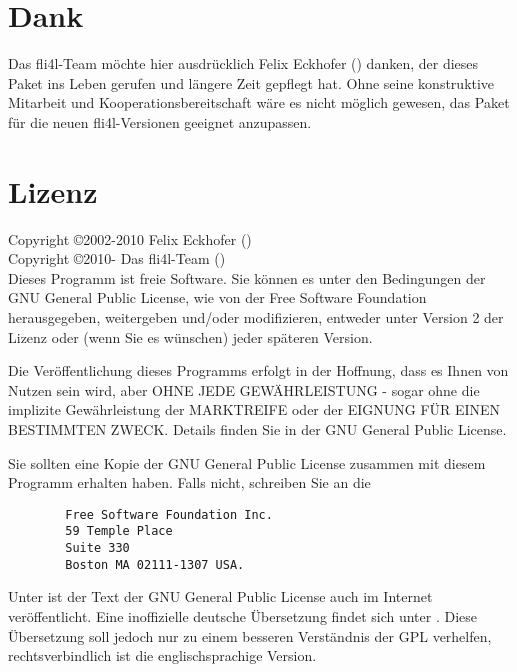 \section{Dank}

Das fli4l-Team möchte hier ausdrücklich Felix Eckhofer ()
danken, der dieses Paket ins Leben gerufen und längere Zeit gepflegt hat. Ohne
seine konstruktive Mitarbeit und Kooperationsbereitschaft wäre es nicht
möglich gewesen, das Paket für die neuen fli4l-Versionen geeignet anzupassen.

\section{Lizenz}

Copyright \copyright  2002-2010 Felix Eckhofer () \\
Copyright \copyright  2010-     Das fli4l-Team () \\

Dieses Programm ist freie Software. Sie können es unter
den Bedingungen der GNU General Public License, wie von der
Free Software Foundation herausgegeben, weitergeben und/oder
modifizieren, entweder unter Version 2 der Lizenz oder (wenn
Sie es wünschen) jeder späteren Version.

Die Veröffentlichung dieses Programms erfolgt in der
Hoffnung, dass es Ihnen von Nutzen sein wird, aber OHNE JEDE
GEWÄHRLEISTUNG - sogar ohne die implizite Gewährleistung
der MARKTREIFE oder der EIGNUNG FÜR EINEN BESTIMMTEN ZWECK.
Details finden Sie in der GNU General Public License.

Sie sollten eine Kopie der GNU General Public License zusammen
mit diesem Programm erhalten haben. Falls nicht, schreiben Sie
an die

\begin{verbatim}
		Free Software Foundation Inc.
		59 Temple Place
		Suite 330
		Boston MA 02111-1307 USA.
\end{verbatim}

Unter  ist der Text der GNU General
Public License auch im Internet veröffentlicht. Eine
inoffizielle deutsche Übersetzung findet sich unter
.
Diese Übersetzung soll jedoch nur zu einem besseren Verständnis
der GPL verhelfen, rechtsverbindlich ist die englischsprachige Version.
